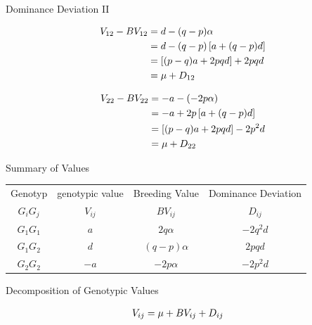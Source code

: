 \documentclass[ignorenonframetext,]{beamer}
\begin{document}
\begin{frame}{Dominance Deviation II}
\protect\hypertarget{dominance-deviation-ii}{}

\begin{align}
  V_{12} - BV_{12} &=   d - (q-p)\alpha \notag \\
                   &=   d - (q-p)\left[ a + (q-p)d \right] \notag \\
                   &=   \left[(p-q)a + 2pqd\right] + 2pqd \notag \\
                   &=   \mu + D_{12} \notag
  \end{align}

\begin{align}
  V_{22} - BV_{22} &=   -a - (-2p\alpha) \notag \\
                   &=   -a + 2p\left[ a + (q-p)d \right] \notag \\
                   &=   \left[(p-q)a + 2pqd\right] - 2p^2d \notag \\
                   &=   \mu + D_{22} \notag
  \end{align}

\end{frame}

\begin{frame}{Summary of Values}
\protect\hypertarget{summary-of-values}{}

\begin{tabular}{|c|c|c|c|}
\hline
Genotyp  &  genotypic value     &  Breeding Value    &  Dominance Deviation \\
$G_iG_j$ &  $V_{ij}$            &  $BV_{ij}$         &  $D_{ij}$           \\
\hline
$G_1G_1$ &  $a$                 &  $2q\alpha$        &  $-2q^2d$          \\
\hline
$G_1G_2$ &  $d$                 &  $(q-p)\alpha$     & $2pqd$             \\
\hline
$G_2G_2$ &  $-a$                &  $-2p\alpha$       & $-2p^2d$           \\
\hline
\end{tabular}

\end{frame}

\begin{frame}{Decomposition of Genotypic Values}
\protect\hypertarget{decomposition-of-genotypic-values}{}

\begin{align}
V_{ij} &=   \mu + BV_{ij} + D_{ij} \notag
\end{align}

\end{frame}
\end{document}
